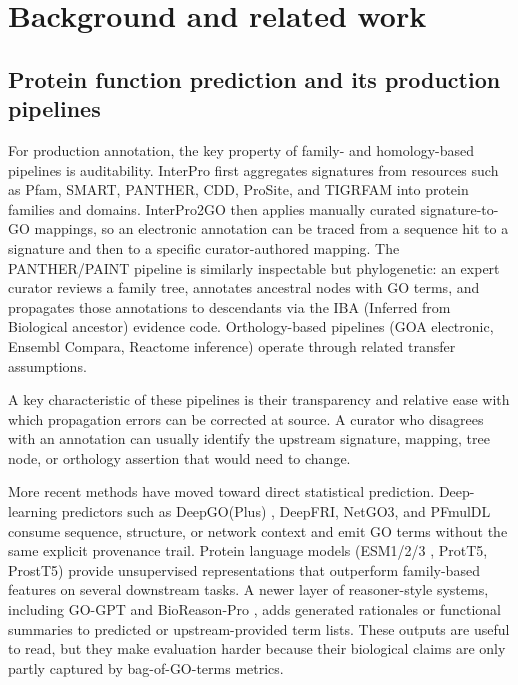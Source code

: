 \documentclass[
  11pt,
]{article}
\begin{document}
\hypertarget{background-and-related-work}{%
\section{Background and related
work}\label{background-and-related-work}}

\hypertarget{protein-function-prediction-and-its-production-pipelines}{%
\subsection{Protein function prediction and its production
pipelines}\label{protein-function-prediction-and-its-production-pipelines}}

For production annotation, the key property of family- and
homology-based pipelines is auditability. InterPro
\cite{paysanlafosse2023} first aggregates signatures from resources such
as Pfam, SMART, PANTHER, CDD, ProSite, and TIGRFAM into protein families
and domains. InterPro2GO then applies manually curated signature-to-GO
mappings, so an electronic annotation can be traced from a sequence hit
to a signature and then to a specific curator-authored mapping. The
PANTHER/PAINT pipeline \cite{gaudet2011} is similarly inspectable but
phylogenetic: an expert curator reviews a family tree, annotates
ancestral nodes with GO terms, and propagates those annotations to
descendants via the IBA (Inferred from Biological ancestor) evidence
code. Orthology-based pipelines (GOA electronic, Ensembl Compara,
Reactome inference) operate through related transfer assumptions.

A key characteristic of these pipelines is their transparency and
relative ease with which propagation errors can be corrected at source. A
curator who disagrees with an annotation can usually identify the
upstream signature, mapping, tree node, or orthology assertion that
would need to change.

More recent methods have moved toward direct statistical prediction.
Deep-learning predictors such as DeepGO(Plus) \cite{kulmanov2020},
DeepFRI, NetGO3, and PFmulDL \cite{yuan2023} consume sequence,
structure, or network context and emit GO terms without the same
explicit provenance trail. Protein language models (ESM1/2/3
\cite{lin2023}, ProtT5, ProstT5) provide unsupervised representations
that outperform family-based features on several downstream tasks. A
newer layer of reasoner-style systems, including GO-GPT and
BioReason-Pro \cite{fallahpour2026}, adds generated rationales or
functional summaries to predicted or upstream-provided term lists. These
outputs are useful to read, but they make evaluation harder because
their biological claims are only partly captured by bag-of-GO-terms
metrics.
\end{document}
